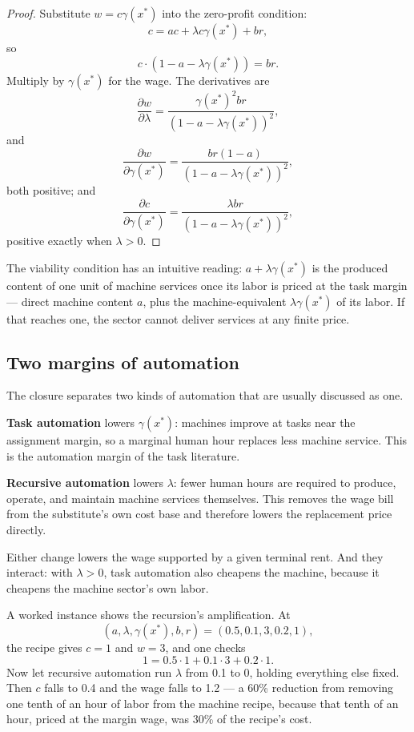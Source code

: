 \documentclass[12pt]{article}
\theoremstyle{plain}
\begin{document}
\begin{proof}
Substitute $w=c\gamma(x^*)$ into the zero-profit condition:
\[
c = ac + \lambda c\gamma(x^*) + br,
\]
so
\[
c\cdot(1-a-\lambda\gamma(x^*)) = br.
\]
Multiply by $\gamma(x^*)$ for the wage. The derivatives are
\[
\frac{\partial w}{\partial\lambda}
=
\frac{\gamma(x^*)^2br}
     {(1-a-\lambda\gamma(x^*))^2},
\]
and
\[
\frac{\partial w}{\partial\gamma(x^*)}
=
\frac{br(1-a)}
     {(1-a-\lambda\gamma(x^*))^2},
\]
both positive; and
\[
\frac{\partial c}{\partial\gamma(x^*)}
=
\frac{\lambda br}
     {(1-a-\lambda\gamma(x^*))^2},
\]
positive exactly when $\lambda>0$.
\end{proof}

The viability condition has an intuitive reading:
$a+\lambda\gamma(x^*)$ is the produced content of one unit of machine services
once its labor is priced at the task margin --- direct machine content $a$, plus
the machine-equivalent $\lambda\gamma(x^*)$ of its labor. If that reaches one,
the sector cannot deliver services at any finite price.


\subsection{Two margins of automation}

The closure separates two kinds of automation that are usually discussed as one.

\textbf{Task automation} lowers $\gamma(x^*)$: machines improve at tasks near the
assignment margin, so a marginal human hour replaces less machine service. This
is the automation margin of the task literature.

\textbf{Recursive automation} lowers $\lambda$: fewer human hours are required to
produce, operate, and maintain machine services themselves. This removes the wage
bill from the substitute's own cost base and therefore lowers the replacement
price directly. 

Either change lowers the wage supported by a given terminal rent. And they
interact: with $\lambda>0$, task automation also cheapens the machine, because it
cheapens the machine sector's own labor.

A worked instance shows the recursion's amplification. At
\[
(a,\lambda,\gamma(x^*),b,r)=(0.5,0.1,3,0.2,1),
\]
the recipe gives $c=1$ and $w=3$, and one checks
\[
1 = 0.5\cdot1 + 0.1\cdot3 + 0.2\cdot1.
\]
Now let recursive automation run $\lambda$ from 0.1 to 0, holding everything
else fixed. Then $c$ falls to 0.4 and the wage falls to 1.2 --- a 60\% reduction
from removing one tenth of an hour of labor from the machine recipe, because
that tenth of an hour, priced at the margin wage, was 30\% of the recipe's cost.
\end{document}
